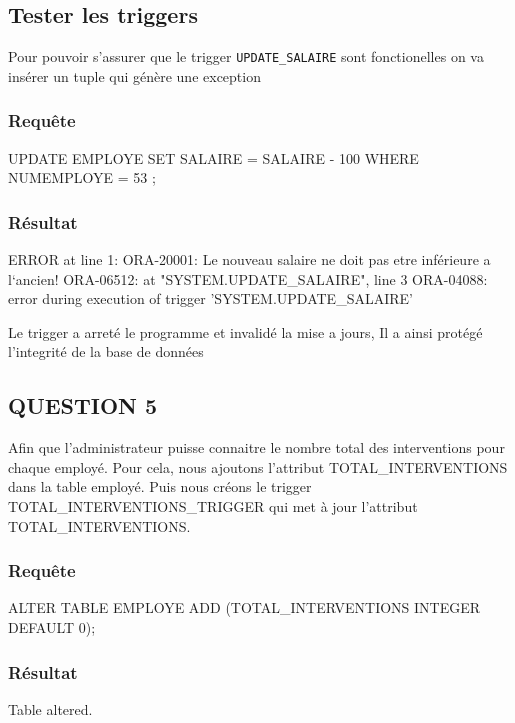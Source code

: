\documentclass[•]{article}
\begin{document}
\subsection{Tester les triggers}
Pour pouvoir s'assurer que le trigger \texttt{UPDATE\_SALAIRE} sont fonctionelles on va insérer un tuple qui génère une exception
\subsubsection{Requête}
\begin{sql}
UPDATE EMPLOYE SET SALAIRE = SALAIRE - 100 WHERE NUMEMPLOYE = 53 ;
\end{sql}

\subsubsection{Résultat}
\begin{sql}
ERROR at line 1:
ORA-20001: Le nouveau salaire ne doit pas etre inférieure a l`ancien!
ORA-06512: at "SYSTEM.UPDATE_SALAIRE", line 3
ORA-04088: error during execution of trigger 'SYSTEM.UPDATE_SALAIRE'
\end{sql}

Le trigger a arreté le programme et invalidé la mise a jours, Il a ainsi protégé l'integrité de la base de données

\subsection{QUESTION 5}
Afin que l’administrateur puisse connaitre le nombre total des interventions pour chaque employé. 
Pour cela, nous ajoutons l'attribut TOTAL\_INTERVENTIONS dans la table employé.
Puis nous créons le trigger TOTAL\_INTERVENTIONS\_TRIGGER qui met à jour l’attribut TOTAL\_INTERVENTIONS.


\subsubsection{Requête}
\begin{sql}
ALTER TABLE EMPLOYE ADD (TOTAL_INTERVENTIONS INTEGER DEFAULT 0);
\end{sql}

\subsubsection{Résultat}
\begin{sql}
Table altered.
\end{sql}
\end{document}

